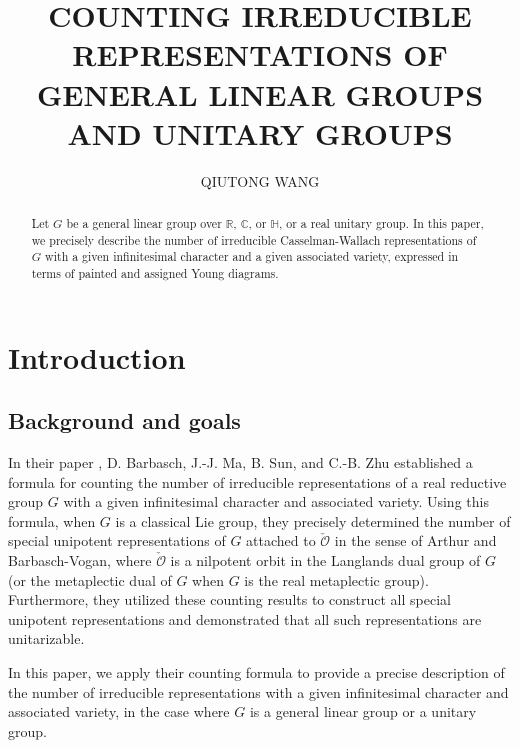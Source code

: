 \documentclass[12pt, a4paper]{amsart}
\author[QIUTONG WANG]{QIUTONG WANG}
\numberwithin{equation}{section}
\newcommand{\BC}{{\mathbb {C}}}
\newcommand{\BH}{{\mathbb {H}}}
\newcommand{\BR}{{\mathbb {R}}}
\newcommand{\CO}{{\mathcal {O}}}
\begin{document}
\title[COUNTING IRREDUCIBLE REPRESENTATIONS]{COUNTING IRREDUCIBLE REPRESENTATIONS OF GENERAL LINEAR GROUPS AND UNITARY GROUPS}
\maketitle

\begin{abstract}
    Let $G$ be a general linear group over $\BR$, $\BC$, or $\BH$, or a real unitary group. In this paper, we precisely describe the number of irreducible Casselman-Wallach representations of $G$ with a given infinitesimal character and a given associated variety, expressed in terms of painted and assigned Young diagrams.
\end{abstract}

\tableofcontents



\section{Introduction}

\subsection{Background and goals}

In their paper \cite{BMSZ}, D. Barbasch, J.-J. Ma, B. Sun, and C.-B. Zhu established a formula for counting the number of irreducible representations of a real reductive group $G$ with a given infinitesimal character and associated variety. Using this formula, when $G$ is a classical Lie group, they precisely determined the number of special unipotent representations of $G$ attached to $\check{\CO}$ in the sense of Arthur and Barbasch-Vogan, where $\check{\CO}$ is a nilpotent orbit in the Langlands dual group of $G$ (or the metaplectic dual of $G$ when $G$ is the real metaplectic group). Furthermore, they utilized these counting results to construct all special unipotent representations and demonstrated that all such representations are unitarizable.

In this paper, we apply their counting formula to provide a precise description of the number of irreducible representations with a given infinitesimal character and associated variety, in the case where $G$ is a general linear group or a unitary group.
\end{document}
